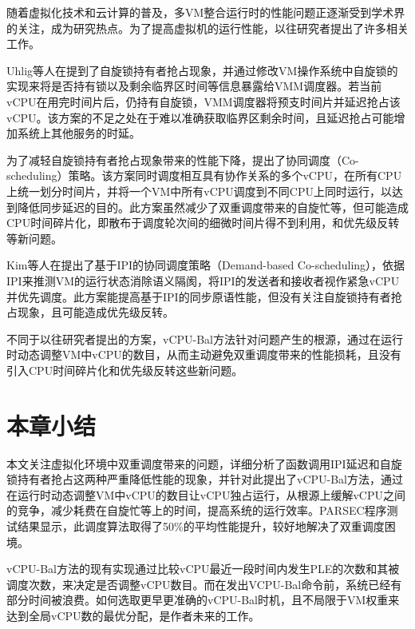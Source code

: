 随着虚拟化技术和云计算的普及，多VM整合运行时的性能问题正逐渐受到学术界的关注，成为研究热点。为了提高虚拟机的运行性能，以往研究者提出了许多相关工作\cite{rao2014towards}。

Uhlig等人在\cite{uhlig2004towards}提到了自旋锁持有者抢占现象，并通过修改VM操作系统中自旋锁的实现来将是否持有锁以及剩余临界区时间等信息暴露给VMM调度器。若当前vCPU在用完时间片后，仍持有自旋锁，VMM调度器将预支时间片并延迟抢占该vCPU。该方案的不足之处在于难以准确获取临界区剩余时间，且延迟抢占可能增加系统上其他服务的时延。

为了减轻自旋锁持有者抢占现象带来的性能下降，\cite{weng2009hybrid}\cite{sukwong2011co}\cite{bai2010task}提出了协同调度（Co-scheduling）策略。该方案同时调度相互具有协作关系的多个vCPU，在所有CPU上统一划分时间片，并将一个VM中所有vCPU调度到不同CPU上同时运行，以达到降低同步延迟的目的。此方案虽然减少了双重调度带来的自旋忙等，但可能造成CPU时间碎片化，即散布于调度轮次间的细微时间片得不到利用，和优先级反转等新问题。

Kim等人在\cite{kim2013demand}提出了基于IPI的协同调度策略（Demand-based Co-scheduling），依据IPI来推测VM的运行状态消除语义隔阂，将IPI的发送者和接收者视作紧急vCPU并优先调度。此方案能提高基于IPI的同步原语性能，但没有关注自旋锁持有者抢占现象，且可能造成优先级反转。

不同于以往研究者提出的方案，vCPU-Bal方法针对问题产生的根源，通过在运行时动态调整VM中vCPU的数目，从而主动避免双重调度带来的性能损耗，且没有引入CPU时间碎片化和优先级反转这些新问题。



\section{本章小结}

本文关注虚拟化环境中双重调度带来的问题，详细分析了函数调用IPI延迟和自旋锁持有者抢占这两种严重降低性能的现象，并针对此提出了vCPU-Bal方法，通过在运行时动态调整VM中vCPU的数目让vCPU独占运行，从根源上缓解vCPU之间的竞争，减少耗费在自旋忙等上的时间，提高系统的运行效率。PARSEC程序测试结果显示，此调度算法取得了50\%的平均性能提升，较好地解决了双重调度困境。

vCPU-Bal方法的现有实现通过比较vCPU最近一段时间内发生PLE的次数和其被调度次数，来决定是否调整vCPU数目。而在发出VCPU-Bal命令前，系统已经有部分时间被浪费。如何选取更早更准确的vCPU-Bal时机，且不局限于VM权重来达到全局vCPU数的最优分配，是作者未来的工作。